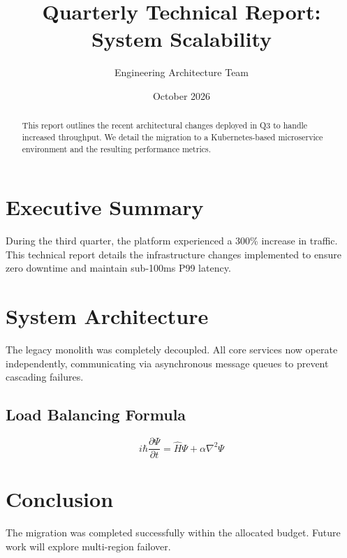 \documentclass[11pt,a4paper]{article}
\begin{document}
\title{\textbf{Quarterly Technical Report: System Scalability}}
\author{Engineering Architecture Team}
\date{October 2026}
\maketitle

\begin{abstract}
This report outlines the recent architectural changes deployed in Q3 to handle increased throughput. We detail the migration to a Kubernetes-based microservice environment and the resulting performance metrics.
\end{abstract}

\tableofcontents
\vspace{5mm}

\section{Executive Summary}
During the third quarter, the platform experienced a 300\% increase in traffic. This technical report details the infrastructure changes implemented to ensure zero downtime and maintain sub-100ms P99 latency. 

\section{System Architecture}
The legacy monolith was completely decoupled. All core services now operate independently, communicating via asynchronous message queues to prevent cascading failures.

\subsection{Load Balancing Formula}
\begin{equation}
i\hbar \frac{\partial \Psi}{\partial t} = \hat{H}\Psi + \alpha \nabla^2 \Psi
\end{equation}

\section{Conclusion}
The migration was completed successfully within the allocated budget. Future work will explore multi-region failover.
\end{document}
